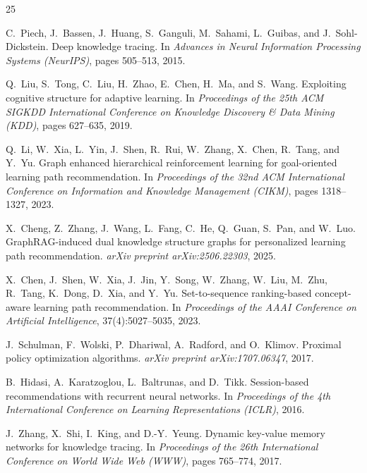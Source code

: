 \documentclass[sigconf,anonymous]{acmart}
\begin{document}

\begin{thebibliography}{25}

C.~Piech, J.~Bassen, J.~Huang, S.~Ganguli, M.~Sahami, L.~Guibas, and J.~Sohl-Dickstein.
\newblock Deep knowledge tracing.
\newblock In \emph{Advances in Neural Information Processing Systems (NeurIPS)}, pages 505--513, 2015.

Q.~Liu, S.~Tong, C.~Liu, H.~Zhao, E.~Chen, H.~Ma, and S.~Wang.
\newblock Exploiting cognitive structure for adaptive learning.
\newblock In \emph{Proceedings of the 25th ACM SIGKDD International Conference on Knowledge Discovery \& Data Mining (KDD)}, pages 627--635, 2019.

Q.~Li, W.~Xia, L.~Yin, J.~Shen, R.~Rui, W.~Zhang, X.~Chen, R.~Tang, and Y.~Yu.
\newblock Graph enhanced hierarchical reinforcement learning for goal-oriented learning path recommendation.
\newblock In \emph{Proceedings of the 32nd ACM International Conference on Information and Knowledge Management (CIKM)}, pages 1318--1327, 2023.

X.~Cheng, Z.~Zhang, J.~Wang, L.~Fang, C.~He, Q.~Guan, S.~Pan, and W.~Luo.
\newblock GraphRAG-induced dual knowledge structure graphs for personalized learning path recommendation.
\newblock \emph{arXiv preprint arXiv:2506.22303}, 2025.

X.~Chen, J.~Shen, W.~Xia, J.~Jin, Y.~Song, W.~Zhang, W.~Liu, M.~Zhu, R.~Tang, K.~Dong, D.~Xia, and Y.~Yu.
\newblock Set-to-sequence ranking-based concept-aware learning path recommendation.
\newblock In \emph{Proceedings of the AAAI Conference on Artificial Intelligence}, 37(4):5027--5035, 2023.

J.~Schulman, F.~Wolski, P.~Dhariwal, A.~Radford, and O.~Klimov.
\newblock Proximal policy optimization algorithms.
\newblock \emph{arXiv preprint arXiv:1707.06347}, 2017.

B.~Hidasi, A.~Karatzoglou, L.~Baltrunas, and D.~Tikk.
\newblock Session-based recommendations with recurrent neural networks.
\newblock In \emph{Proceedings of the 4th International Conference on Learning Representations (ICLR)}, 2016.

J.~Zhang, X.~Shi, I.~King, and D.-Y.~Yeung.
\newblock Dynamic key-value memory networks for knowledge tracing.
\newblock In \emph{Proceedings of the 26th International Conference on World Wide Web (WWW)}, pages 765--774, 2017.


\end{thebibliography}
\end{document}
